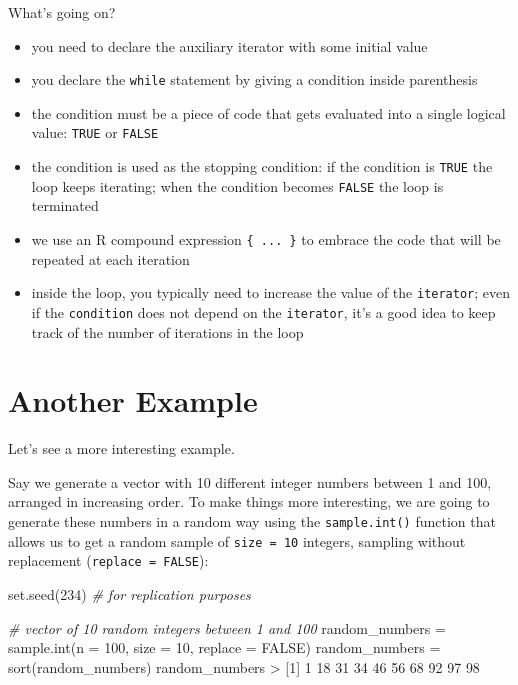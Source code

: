 \documentclass[
]{book}
\newenvironment{Shaded}{\begin{snugshade}}{\end{snugshade}}
\newcommand{\AttributeTok}[1]{\textcolor[rgb]{0.77,0.63,0.00}{#1}}
\newcommand{\CommentTok}[1]{\textcolor[rgb]{0.56,0.35,0.01}{\textit{#1}}}
\newcommand{\ConstantTok}[1]{\textcolor[rgb]{0.00,0.00,0.00}{#1}}
\newcommand{\DecValTok}[1]{\textcolor[rgb]{0.00,0.00,0.81}{#1}}
\newcommand{\FunctionTok}[1]{\textcolor[rgb]{0.00,0.00,0.00}{#1}}
\newcommand{\NormalTok}[1]{#1}
\newcommand{\OtherTok}[1]{\textcolor[rgb]{0.56,0.35,0.01}{#1}}
\newcommand{\SpecialCharTok}[1]{\textcolor[rgb]{0.00,0.00,0.00}{#1}}
\begin{document}
What's going on?

\begin{itemize}
\item
  you need to declare the auxiliary iterator with some initial value
\item
  you declare the \texttt{while} statement by giving a condition inside parenthesis
\item
  the condition must be a piece of code that gets evaluated into a single
  logical value: \texttt{TRUE} or \texttt{FALSE}
\item
  the condition is used as the stopping condition: if the condition is \texttt{TRUE}
  the loop keeps iterating; when the condition becomes \texttt{FALSE} the loop is
  terminated
\item
  we use an R compound expression \texttt{\{\ ...\ \}} to embrace the code that will be
  repeated at each iteration
\item
  inside the loop, you typically need to increase the value of the \texttt{iterator};
  even if the \texttt{condition} does not depend on the \texttt{iterator}, it's a good idea
  to keep track of the number of iterations in the loop
\end{itemize}

\hypertarget{another-example}{%
\section{Another Example}\label{another-example}}

Let's see a more interesting example.

Say we generate a vector with 10 different integer numbers between 1 and 100,
arranged in increasing order. To make things more interesting, we are going to
generate these numbers in a random way using the \texttt{sample.int()} function that
allows us to get a random sample of \texttt{size\ =\ 10} integers, sampling without
replacement (\texttt{replace\ =\ FALSE}):

\begin{Shaded}
\begin{Highlighting}[]
\FunctionTok{set.seed}\NormalTok{(}\DecValTok{234}\NormalTok{)  }\CommentTok{\# for replication purposes}

\CommentTok{\# vector of 10 random integers between 1 and 100}
\NormalTok{random\_numbers }\OtherTok{=} \FunctionTok{sample.int}\NormalTok{(}\AttributeTok{n =} \DecValTok{100}\NormalTok{, }\AttributeTok{size =} \DecValTok{10}\NormalTok{, }\AttributeTok{replace =} \ConstantTok{FALSE}\NormalTok{)}
\NormalTok{random\_numbers }\OtherTok{=} \FunctionTok{sort}\NormalTok{(random\_numbers)}
\NormalTok{random\_numbers}
\SpecialCharTok{\textgreater{}}\NormalTok{  [}\DecValTok{1}\NormalTok{]  }\DecValTok{1} \DecValTok{18} \DecValTok{31} \DecValTok{34} \DecValTok{46} \DecValTok{56} \DecValTok{68} \DecValTok{92} \DecValTok{97} \DecValTok{98}
\end{Highlighting}
\end{Shaded}
\end{document}

